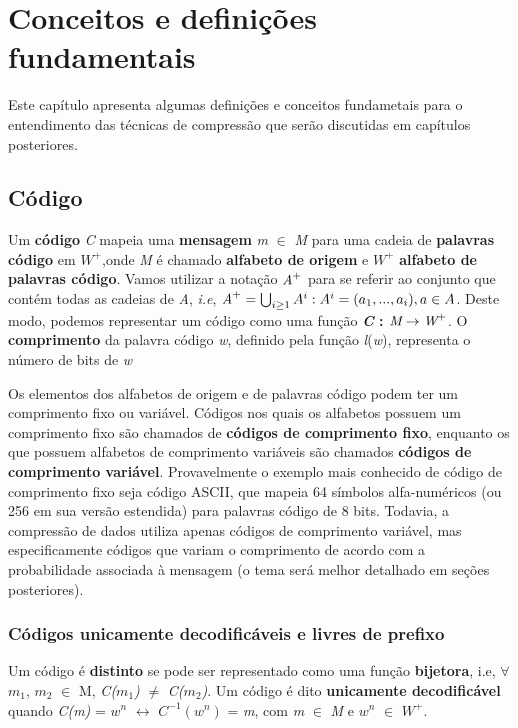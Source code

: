 \chapter{Conceitos e definições fundamentais}
Este capítulo apresenta algumas definições e conceitos fundametais para o entendimento das técnicas de compressão que serão discutidas em capítulos posteriores.

\section{Código}

Um \textbf{código} \emph{C} mapeia uma \textbf{mensagem} \emph{m} $\in$ \emph{M} para uma cadeia de \textbf{palavras código} em \emph{$W^+$},onde \emph{M} é chamado \textbf{alfabeto de origem} e \emph{$W^+$} \textbf{alfabeto de palavras código}. Vamos utilizar a notação $\emph{A}^+$ para se referir ao conjunto que contém todas as cadeias de \emph{A}, \emph{i.e}, $\emph{A}^+ = \bigcup_{i \geq 1}^{}A^{i} : A^i = (a_1,...,a_i), a \in A $. Deste modo, podemos representar um código como uma função \textbf{\emph{C} : $\emph{M} \rightarrow \emph{W}^+$}.  O \textbf{comprimento} da palavra código \emph{w}, definido pela função \emph{l}(\emph{w}), representa o número de bits de \emph{w}

Os elementos dos alfabetos de origem e de palavras código podem ter um comprimento fixo ou variável. Códigos nos quais os alfabetos possuem um comprimento fixo são chamados de \textbf{códigos de comprimento fixo}, enquanto os que possuem alfabetos de comprimento variáveis são chamados \textbf{códigos de comprimento variável}. Provavelmente o exemplo mais conhecido de código de comprimento fixo seja código ASCII, que mapeia 64 símbolos alfa-numéricos (ou 256 em sua versão estendida) para palavras código de 8 bits. Todavia, a compressão de dados utiliza apenas códigos de comprimento variável, mas especificamente códigos que variam o comprimento de acordo com a probabilidade associada à mensagem (o tema será melhor detalhado em seções posteriores). 

\subsection{Códigos unicamente decodificáveis e livres de prefixo}
Um código é \textbf{distinto} se pode ser representado como uma função \textbf{bijetora}, i.e, $\forall$ $m_1$, $m_2$ $\in$ M, \emph{C($m_1$)} $\neq$ \emph{C($m_2$)}. Um código é dito \textbf{unicamente decodificável} quando \emph{C(m)} = $w^n$ $\leftrightarrow$ \emph{$C^{-1}(w^n)$} = \emph{m}, com \emph{m} $\in$ \emph{M} e \emph{$w^n$} $\in$ $W^+$.

